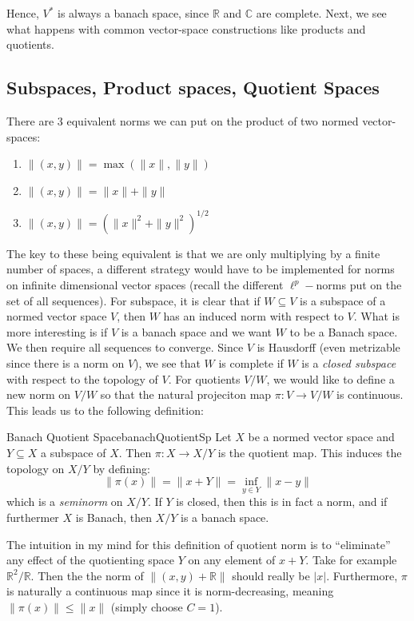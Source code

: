 \documentclass[oneside]{book}
\newcommand{\R}{\mathbb{R}}
\newcommand{\C}{\mathbb{C}}
\newcommand{\sse}{\subseteq}
\newcommand{\rw}{\rightarrow}
\begin{document}
Hence, $V^*$ is always a banach space, since $\R$ and $\C$ are complete. Next, we see what happens with common
vector-space constructions like products and quotients.
\subsection*{Subspaces, Product spaces, Quotient Spaces}

There are 3 equivalent norms we can put on the product of two
normed vector-spaces:
\begin{enumerate}
	\item $\|(x,y)\| = \max(\|x\|, \|y\|)$
	\item $\|(x,y)\| = \|x\| + \|y\|$
	\item $\|(x,y)\| = (\|x\|^2 + \|y\|^2)^{1/2}$
\end{enumerate}

The key to these being equivalent is that we are only multiplying by a finite number of spaces, a different strategy
would have to be implemented for norms on infinite dimensional vector spaces (recall the different $\ell^p-$norms put on
the set of all sequences). For subspace, it is clear that if $W \sse V$ is a subspace of a normed vector space $V$, then $W$
has an induced norm with respect to $V$. What is more interesting is if $V$ is a banach space and we want $W$ to be
a Banach space. We then require all sequences to converge. Since $V$ is Hausdorff (even metrizable since there is a norm
on $V$), we see that $W$ is complete if $W$ is a \emph{closed subspace} with respect to the topology of $V$.
For quotients $V/W$, we would like to define a new norm on $V/W$ so that the natural projeciton map $\pi: V \to V/W$ is
continuous. This leads us to the following definition:

\begin{prop}{Banach Quotient Space}{banachQuotientSp}
	Let $X$ be a normed vector space and $Y \sse X$ a subspace of $X$. Then $\pi: X \rw X/Y$ is the quotient map.
	This induces the topology on $X/Y$ by defining:
	\[
		\|\pi(x)\| = \|x+Y\| = \inf_{y \in Y}\|x-y\|
	\]
	which is a \emph{seminorm} on $X/Y$. If $Y$ is closed, then this is in fact a norm, and if furthermer $X$ is Banach, then
	$X/Y$ is a banach space.
\end{prop}

The intuition in my mind for this definition of quotient norm is to ``eliminate'' any effect of the quotienting space
$Y$ on any element of $x + Y$. Take for example $\R^2/\R$.  Then the the norm of $\|(x,y) + \R\|$ should really be
$|x|$. Furthermore, $\pi$ is naturally a continuous map since it is norm-decreasing, meaning $\|\pi(x)\| \le \|x\|$
(simply choose $C = 1$).
\end{document}
